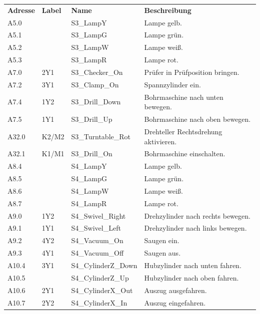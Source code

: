 \documentclass[11pt,a4paper,ngerman]{article}
\begin{document}
\begin{center}
	\medskip
	
	\begin{tabularx}{\textwidth}{|p{1.5cm}|p{1cm}|p{4cm}|X|}
		\hline
		\rowcolor{tublau}
		\multicolumn{4}{|c|}{\bf \color{white} \large Ausgänge}\\
		\hline\hline
		\rowcolor{gray!80}
		\bf Adresse & \bf Label & \bf Name & \bf Beschreibung \\
		\hline\hline
		A5.0  &       & S3\_LampY & Lampe gelb.\\
		A5.1  &       & S3\_LampG & Lampe grün.\\
		A5.2  &       & S3\_LampW & Lampe weiß.\\
		A5.3  &       & S3\_LampR & Lampe rot.\\
		A7.0  & 2Y1   & S3\_Checker\_On & Prüfer in Prüfposition bringen.\\
		A7.2  & 3Y1   & S3\_Clamp\_On & Spannzylinder ein.\\
		A7.4  & 1Y2   & S3\_Drill\_Down & Bohrmaschine nach unten bewegen.\\
		A7.5  & 1Y1   & S3\_Drill\_Up & Bohrmaschine nach oben bewegen.\\
		A32.0 & K2/M2 & S3\_Turntable\_Rot & Drehteller Rechtsdrehung aktivieren.\\
		A32.1 & K1/M1 & S3\_Drill\_On & Bohrmaschine einschalten.\\
		\hline
		A8.4  &       & S4\_LampY & Lampe gelb.\\
		A8.5  &       & S4\_LampG & Lampe grün.\\
		A8.6  &       & S4\_LampW & Lampe weiß.\\
		A8.7  &       & S4\_LampR & Lampe rot.\\
		A9.0  & 1Y2   & S4\_Swivel\_Right & Drehzylinder nach rechts bewegen.\\
		A9.1  & 1Y1   & S4\_Swivel\_Left & Drehzylinder nach links bewegen.\\
		A9.2  & 4Y2   & S4\_Vacuum\_On & Saugen ein.\\
		A9.3  & 4Y1   & S4\_Vacuum\_Off & Saugen aus.\\
		A10.4 & 3Y1   & S4\_CylinderZ\_Down & Hubzylinder nach unten fahren.\\
		A10.5 &       & S4\_CylinderZ\_Up & Hubzylinder nach oben fahren.\\
		A10.6 & 2Y1   & S4\_CylinderX\_Out & Auszug ausgefahren.\\
		A10.7 & 2Y2   & S4\_CylinderX\_In & Auszug eingefahren.\\
		\hline
	\end{tabularx}
\end{center}
\end{document}
